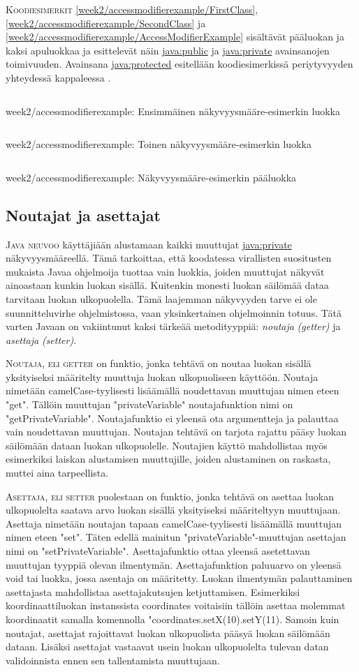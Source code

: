 \documentclass[openany]{book}
\newcommand{\newthought}[1]{\smallskip\textsc{#1}}
\newcommand{\eng}[1]{\textit{(#1)}}
\newcommand{\new}[1]{\textit{\gls{#1}}}
\newcommand{\neweng}[2]{\new{#1} \eng{#2}}
\newcommand{\java}[1]{\underline{\gls{java:#1}}}
\newcommand{\code}[3]{
	\begin{listing}
		\linespread{0.85}
		\inputminted{java}{OhjelmointiopasEsimerkit/src/#1/#2.java}
		\caption{#1: #3}
		\label{#1/#2}
	\end{listing}
}
\begin{document}
\newthought{Koodiesimerkit} \ref{week2/accessmodifierexample/FirstClass},
\ref{week2/accessmodifierexample/SecondClass} ja
\ref{week2/accessmodifierexample/AccessModifierExample} sisältävät pääluokan ja kaksi apuluokkaa
ja esittelevät näin \java{public} ja \java{private} avainsanojen toimivuuden. Avainsana
\java{protected} esitellään koodiesimerkissä periytyvyyden yhteydessä kappaleessa
.

\code{week2/accessmodifierexample}{FirstClass}{Ensimmäinen näkyvyysmääre-esimerkin luokka}
\code{week2/accessmodifierexample}{SecondClass}{Toinen näkyvyysmääre-esimerkin luokka}
\code{week2/accessmodifierexample}{AccessModifierExample}{Näkyvyysmääre-esimerkin pääluokka}

\subsection{Noutajat ja asettajat}
\label{get set}

\newthought{Java neuvoo} käyttäjiään alustamaan kaikki muuttujat \java{private} näkyvyysmääreellä.
Tämä tarkoittaa, että koodatessa virallisten suositusten mukaista Javaa ohjelmoija tuottaa vain
luokkia, joiden muuttujat näkyvät ainoastaan kunkin luokan sisällä. Kuitenkin monesti luokan
säilömää dataa tarvitaan luokan ulkopuolella. Tämä laajemman näkyvyyden tarve ei ole
suunnitteluvirhe ohjelmistossa, vaan yksinkertainen ohjelmoinnin totuus. Tätä varten Javaan on
vakiintunut kaksi tärkeää metodityyppiä: \neweng{noutaja}{getter} ja \neweng{asettaja}{setter}.

\newthought{Noutaja, eli getter} on funktio, jonka tehtävä on noutaa luokan sisällä yksityiseksi
määritelty muuttuja luokan ulkopuoliseen käyttöön. Noutaja nimetään camelCase-tyylisesti
lisäämällä noudettavan muuttujan nimen eteen "get". Tällöin muuttujan "privateVariable"
noutajafunktion nimi on "getPrivateVariable". Noutajafunktio ei yleensä ota argumentteja ja
palauttaa vain noudettavan muuttujan. Noutajan tehtävä on tarjota rajattu pääsy luokan
säilömään dataan luokan ulkopuolelle. Noutajien käyttö mahdollistaa myös esimerkiksi laiskan
alustamisen muuttujille, joiden alustaminen on raskasta, muttei aina tarpeellista.

\newthought{Asettaja, eli setter} puolestaan on funktio, jonka tehtävä on asettaa luokan
ulkopuolelta saatava arvo luokan sisällä yksityiseksi määriteltyyn muuttujaan. Asettaja nimetään
noutajan tapaan camelCase-tyylisesti lisäämällä muuttujan nimen eteen "set". Täten edellä mainitun
"privateVariable"-muuttujan asettajan nimi on "setPrivateVariable". Asettajafunktio ottaa yleensä
asetettavan muuttujan tyyppiä olevan ilmentymän. Asettajafunktion paluuarvo on yleensä void tai
luokka, jossa asentaja on määritetty. Luokan ilmentymän palauttaminen asettajasta mahdollistaa
asettajakutsujen ketjuttamisen. Esimerkiksi koordinaattiluokan instanssista coordinates voitaisiin
tällöin asettaa molemmat koordinaatit samalla komennolla "coordinates.setX(10).setY(11). Samoin
kuin noutajat, asettajat rajoittavat luokan ulkopuolista pääsyä luokan säilömään dataan. Lisäksi
asettajat vastaavat usein luokan ulkopuolelta tulevan datan validoinnista ennen sen tallentamista
muuttujaan.
\end{document}
